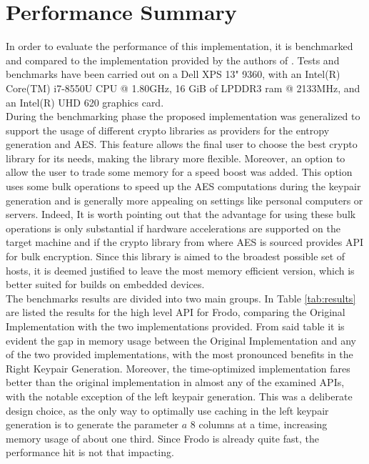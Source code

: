 \section{Performance Summary}
In order to evaluate the performance of this implementation, it is benchmarked and compared to the implementation provided by the authors of \cite{frodo}. Tests and benchmarks have been carried out on a Dell XPS 13" 9360, with an Intel(R) Core(TM) i7-8550U CPU @ 1.80GHz, 16 GiB of LPDDR3 ram @ 2133MHz, and an Intel(R) UHD 620 graphics card.\\
During the benchmarking phase the proposed implementation was generalized to support the usage of different crypto libraries as providers for the entropy generation and AES. This feature allows the final user to choose the best crypto library for its needs, making the library more flexible. Moreover, an option to allow the user to trade some memory for a speed boost was added. This option uses some bulk operations to speed up the AES computations during the keypair generation and is generally more appealing on settings like personal computers or servers. Indeed, It is worth pointing out that the advantage for using these bulk operations is only substantial if hardware accelerations are supported on the target machine and if the crypto library from where AES is sourced provides API for bulk encryption. Since this library is aimed to the broadest possible set of hosts, it is deemed justified to leave the most memory efficient version, which is better suited for builds on embedded devices.\\
The benchmarks results are divided into two main groups. In Table \ref{tab:results} are listed the results for the high level API for Frodo, comparing the Original Implementation with the two implementations provided. From said table it is evident the gap in memory usage between the Original Implementation and any of the two provided implementations, with the most pronounced benefits in the Right Keypair Generation. Moreover, the time-optimized implementation fares better than the original implementation in almost any of the examined APIs, with the notable exception of the left keypair generation. This was a deliberate design choice, as the only way to optimally use caching in the left keypair generation is to generate the parameter $a$ $8$ columns at a time, increasing memory usage of about one third. Since Frodo is already quite fast, the performance hit is not that impacting.\\


